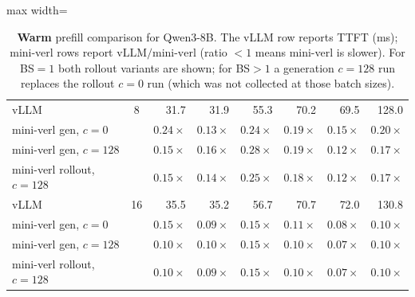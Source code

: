 \begin{table}[htbp]
\begin{adjustbox}{max width=\textwidth}
\begin{tabular}{lcrrrrrr}
        \midrule
        vLLM                         & 8 & 31.7 & 31.9 & 55.3 & 70.2 & 69.5 & 128.0 \\
        mini-verl gen, $c{=}0$       &   & $0.24{\times}$ & $0.13{\times}$ & $0.24{\times}$ & $0.19{\times}$ & $0.15{\times}$ & $0.20{\times}$ \\
        mini-verl gen, $c{=}128$     &   & $0.15{\times}$ & $0.16{\times}$ & $0.28{\times}$ & $0.19{\times}$ & $0.12{\times}$ & $0.17{\times}$ \\
        mini-verl rollout, $c{=}128$ &   & $0.15{\times}$ & $0.14{\times}$ & $0.25{\times}$ & $0.18{\times}$ & $0.12{\times}$ & $0.17{\times}$ \\
        \midrule
        vLLM                         & 16 & 35.5 & 35.2 & 56.7 & 70.7 & 72.0 & 130.8 \\
        mini-verl gen, $c{=}0$       &    & $0.15{\times}$ & $0.09{\times}$ & $0.15{\times}$ & $0.11{\times}$ & $0.08{\times}$ & $0.10{\times}$ \\
        mini-verl gen, $c{=}128$     &    & $0.10{\times}$ & $0.10{\times}$ & $0.15{\times}$ & $0.10{\times}$ & $0.07{\times}$ & $0.10{\times}$ \\
        mini-verl rollout, $c{=}128$ &    & $0.10{\times}$ & $0.09{\times}$ & $0.15{\times}$ & $0.10{\times}$ & $0.07{\times}$ & $0.10{\times}$ \\
        \bottomrule
    \end{tabular}
    \end{adjustbox}
    \caption{%
        \textbf{Warm} prefill comparison for Qwen3-8B.
        The vLLM row reports TTFT (ms); mini-verl rows report
        $\text{vLLM} / \text{mini-verl}$ (ratio ${<}1$ means mini-verl is
        slower). For BS${=}1$ both rollout variants are shown; for
        BS${>}1$ a generation $c{=}128$ run replaces the rollout $c{=}0$
        run (which was not collected at those batch sizes).
    }
    \label{tab:qwen3-prefill-warm}
\end{table}

